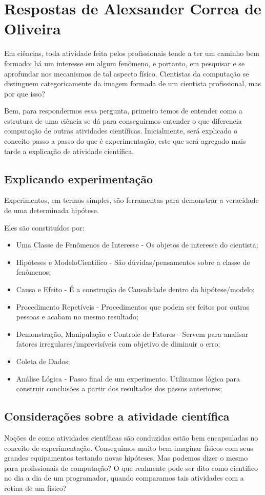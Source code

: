 \section{Respostas de Alexsander Correa de Oliveira}

Em ciências, toda atividade feita pelos profissionais tende a ter um caminho bem formado: há um interesse em algum fenômeno, e portanto, em pesquisar e se aprofundar nos mecanismos de tal aspecto físico. Cientistas da computação se distinguem categoricamente da imagem formada de um cientista profissional, mas por que isso?

Bem, para respondermos essa pergunta, primeiro temos de entender como a estrutura de uma ciência se dá para conseguirmos entender o que diferencia computação de outras atividades científicas. Inicialmente, será explicado o conceito passo a passo do que é experimentação, este que será agregado mais tarde a explicação de atividade científica.

\subsection{Explicando experimentação}

    Experimentos, em termos simples, são ferramentas para demonstrar a veracidade de uma determinada hipótese.
    
    Eles são constituídos por:
\begin{itemize}
    \item Uma Classe de Fenômenos de Interesse - Os objetos de interesse do cientista;
    \item Hipóteses e \gls{ModeloCientifico} - São dúvidas/pensamentos sobre a classe de fenômenos;
    \item Causa e Efeito - É a construção de \gls{Causalidade} dentro da hipótese/modelo;
    \item Procedimento Repetíveis - Procedimentos que podem ser feitos por outras pessoas e acabam no mesmo resultado;
    \item Demonstração, Manipulação e Controle de Fatores - Servem para analisar fatores irregulares/imprevisíveis com objetivo de diminuir o erro;
    \item Coleta de Dados;
    \item Análise Lógica - Passo final de um experimento. Utilizamos lógica para construir conclusões a partir dos resultados dos passos anteriores;
\end{itemize}

\subsection{Considerações sobre a atividade científica}
    Noções de como atividades científicas são conduzidas estão bem encapsuladas no conceito de experimentação. Conseguimos muito bem imaginar físicos com seus grandes equipamentos testando novas hipóteses. Mas podemos dizer o mesmo para profissionais de computação? O que realmente pode ser dito como científico no dia a dia de um programador, quando comparamos tais atividades com a rotina de um físico?

